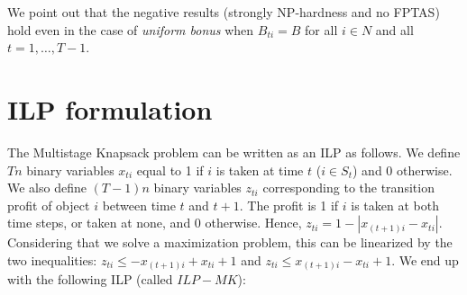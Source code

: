 \documentclass[a4paper]{book}
\begin{document}
We point out that the negative results (strongly NP-hardness and no FPTAS) hold even in the case of {\it uniform bonus} when $B_{ti}=B$ for all $i\in N$ and all $t=1,\dots,T-1$. 





\section{ILP formulation}

The {\sc Multistage  Knapsack} problem can be written as an ILP as follows. We define $Tn$ binary variables $x_{ti}$ equal to 1 if $i$ is taken at time $t$ ($i\in S_t$) and 0 otherwise. We also define $(T-1)n$ binary variables $z_{ti}$ corresponding to the transition profit of object $i$ between time $t$ and $t+1$. The profit is 1 if $i$ is taken at both time steps, or taken at none, and 0 otherwise. Hence, $z_{ti}=1-|x_{(t+1)i}-x_{ti}|$. Considering that we solve a maximization problem, this can be linearized by the two inequalities: $z_{ti}\leq -x_{(t+1)i} + x_{ti} +1$ and $z_{ti}\leq x_{(t+1)i} - x_{ti} +1$. We end up with the following ILP (called $ILP-MK$):  

\end{document}
